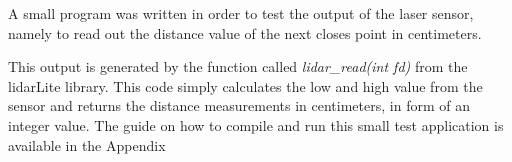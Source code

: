 
A small program was written in order to test the output of the laser sensor, namely to read out the distance value of the next closes point in centimeters. 


This output is generated by the function called \textit{lidar\_read(int fd)} from the lidarLite library. This code simply calculates the low and high value from the sensor and returns the distance measurements in centimeters, in form of an integer value. The guide on how to compile and run this small test application is available in the Appendix \\ %

